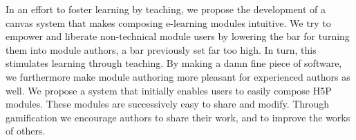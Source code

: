 In an effort to foster learning by teaching, we propose the development of a 
canvas system that makes composing e-learning modules intuitive. We try to 
empower and liberate non-technical module users by lowering the bar for 
turning them into module authors, a bar previously set far too high. In turn, 
this stimulates learning through teaching. By making a damn fine piece of 
software, we furthermore make module authoring more pleasant for experienced 
authors as well. We propose a system that initially enables users to easily 
compose H5P modules. These modules are successively easy to share and modify. 
Through gamification we encourage authors to share their work, and to improve 
the works of others.
